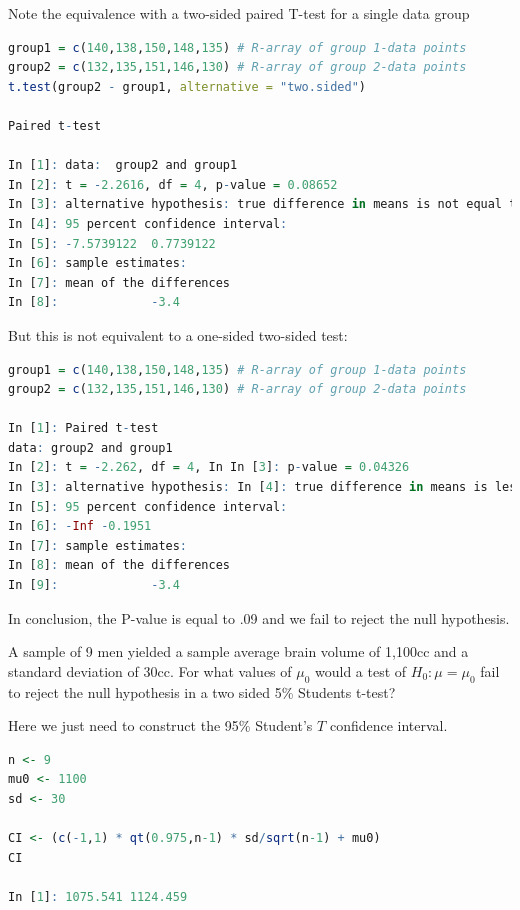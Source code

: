 \documentclass{homework}
\begin{document}
Note the equivalence with a two-sided paired T-test for a single data group

\begin{lstlisting}[language=R]
group1 = c(140,138,150,148,135) # R-array of group 1-data points
group2 = c(132,135,151,146,130) # R-array of group 2-data points
t.test(group2 - group1, alternative = "two.sided")

Paired t-test

In [1]: data:  group2 and group1
In [2]: t = -2.2616, df = 4, p-value = 0.08652
In [3]: alternative hypothesis: true difference in means is not equal to 0
In [4]: 95 percent confidence interval:
In [5]: -7.5739122  0.7739122
In [6]: sample estimates:
In [7]: mean of the differences 
In [8]:             -3.4 
\end{lstlisting}

But this is not equivalent to a one-sided two-sided test:

\begin{lstlisting}[language=R]
group1 = c(140,138,150,148,135) # R-array of group 1-data points
group2 = c(132,135,151,146,130) # R-array of group 2-data points

In [1]: Paired t-test
data: group2 and group1
In [2]: t = -2.262, df = 4, In In [3]: p-value = 0.04326
In [3]: alternative hypothesis: In [4]: true difference in means is less than 0
In [5]: 95 percent confidence interval:
In [6]: -Inf -0.1951
In [7]: sample estimates:
In [8]: mean of the differences
In [9]:             -3.4
\end{lstlisting}

In conclusion, the P-value is equal to .09 and we fail to reject the null hypothesis. \\ 

\begin{tcolorbox}[title=Question 3]
A sample of 9 men yielded a sample average brain volume of 1,100cc and a standard deviation of 30cc. For what values of $\mu_0$ would a test of $H_0: \mu = \mu_0$  fail to reject the null hypothesis in a two sided 5\% Students t-test?
\end{tcolorbox}

Here we just need to construct the 95\% Student's $T$ confidence interval.

\begin{lstlisting}[language=R]
n <- 9
mu0 <- 1100
sd <- 30

CI <- (c(-1,1) * qt(0.975,n-1) * sd/sqrt(n-1) + mu0)
CI

In [1]: 1075.541 1124.459
\end{lstlisting}
\end{document}
